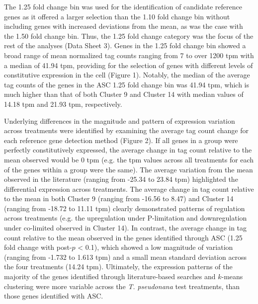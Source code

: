 The 1.25 fold change bin was used for the identification of candidate reference genes as it offered a larger selection than the 1.10 fold change bin without including genes with increased deviations from the mean, as was the case with the 1.50 fold change bin. Thus, the 1.25 fold change category was the focus of the rest of the analyses (Data Sheet 3). Genes in the 1.25 fold change bin showed a broad range of mean normalized tag counts ranging from 7 to over 1200 tpm with a median of 41.94 tpm, providing for the selection of genes with different levels of constitutive expression in the cell (Figure 1). Notably, the median of the average tag counts of the genes in the ASC 1.25 fold change bin was 41.94 tpm, which is much higher than that of both Cluster 9 and Cluster 14 with median values of 14.18 tpm and 21.93 tpm, respectively. \par
	Underlying differences in the magnitude and pattern of expression variation across treatments were identified by examining the average tag count change for each reference gene detection method (Figure 2). If all genes in a group were perfectly constitutively expressed, the average change in tag count relative to the mean observed would be 0 tpm (e.g. the tpm values across all treatments for each of the genes within a group were the same). The average variation from the mean observed in the literature (ranging from -25.34 to 23.84 tpm) highlighted the differential expression across treatments. The average change in tag count relative to the mean in both Cluster 9 (ranging from -16.56 to 8.47) and Cluster 14 (ranging from -18.72 to 11.11 tpm) clearly demonstrated patterns of regulation across treatments (e.g. the upregulation under P-limitation and downregulation under co-limited observed in Cluster 14). In contrast, the average change in tag count relative to the mean observed in the genes identified through ASC (1.25 fold change with post-$p$ < 0.1), which showed a low magnitude of variation (ranging from -1.732 to 1.613 tpm) and a small mean standard deviation across the four treatments (14.24 tpm). Ultimately, the expression patterns of the majority of the genes identified through literature-based searches and $k$-means clustering were more variable across the \textit{T. pseudonana} test treatments, than those genes identified with ASC.\par	 
